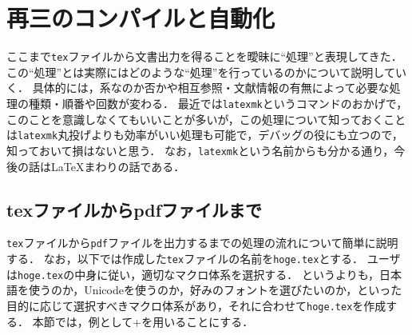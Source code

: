 \documentclass[./main]{subfiles}
\begin{document}
\section{再三のコンパイルと自動化}
\noindent
ここまで\verb|tex|ファイルから文書出力を得ることを曖昧に``処理''と表現してきた．
この``処理''とは実際にはどのような``処理''を行っているのかについて説明していく．
具体的には，\pdfTeX 系なのか否かや相互参照・文献情報の有無によって必要な処理の種類・順番や回数が変わる．
最近では\verb|latexmk|というコマンドのおかげで，このことを意識しなくてもいいことが多いが，この処理について知っておくことは\verb|latexmk|丸投げよりも効率がいい処理も可能で，デバッグの役にも立つので，知っておいて損はないと思う．
なお，\verb|latexmk|という名前からも分かる通り，今後の話は\LaTeX まわりの話である．

\subsection{texファイルからpdfファイルまで}
\noindent
\verb|tex|ファイルから\verb|pdf|ファイルを出力するまでの処理の流れについて簡単に説明する\supercite{LaTeXcompile_Yamamoto}．
なお，以下では作成した\verb|tex|ファイルの名前を\verb|hoge.tex|とする．
ユーザは\verb|hoge.tex|の中身に従い，適切なマクロ体系を選択する．
というよりも，日本語を使うのか，Unicodeを使うのか，好みのフォントを選びたいのか，といった目的に応じて選択すべきマクロ体系があり，それに合わせて\verb|hoge.tex|を作成する．
本節では，例として\LuaLaTeX $+$\upBibTeX を用いることにする．
\end{document}
